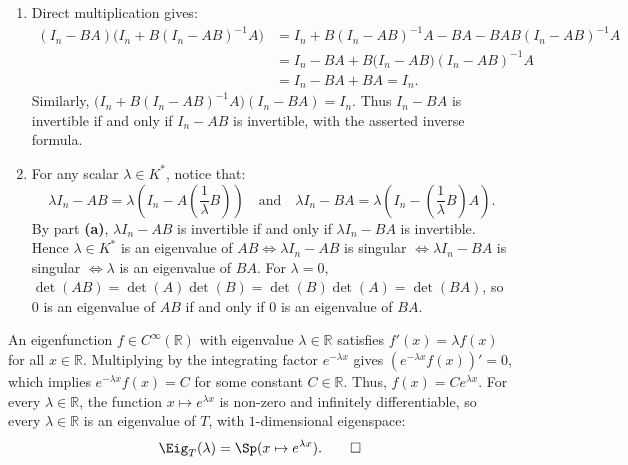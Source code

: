 \begin{exercisesolution}
\label{sol:resolvent_identity_matrix_products}
\begin{enumerate}[label=\textbf{(\alph*)}]
    \item Direct multiplication gives:
    \begin{align*}
    (I_n - BA)\big(I_n + B(I_n - AB)^{-1}A\big) &= I_n + B(I_n - AB)^{-1}A - BA - BAB(I_n - AB)^{-1}A \\
    &= I_n - BA + B\big(I_n - AB\big)(I_n - AB)^{-1}A \\
    &= I_n - BA + BA = I_n.
    \end{align*}
    Similarly, $\big(I_n + B(I_n - AB)^{-1}A\big)(I_n - BA) = I_n$.
    Thus $I_n - BA$ is invertible if and only if $I_n - AB$ is invertible, with the asserted inverse formula.

    \item For any scalar $\lambda \in K^*$, notice that:
    \[
    \lambda I_n - AB = \lambda\left(I_n - A\left(\frac{1}{\lambda}B\right)\right) \quad \text{and} \quad \lambda I_n - BA = \lambda\left(I_n - \left(\frac{1}{\lambda}B\right)A\right).
    \]
    By part \textbf{(a)}, $\lambda I_n - AB$ is invertible if and only if $\lambda I_n - BA$ is invertible.
    Hence $\lambda \in K^*$ is an eigenvalue of $AB \iff \lambda I_n - AB$ is singular $\iff \lambda I_n - BA$ is singular $\iff \lambda$ is an eigenvalue of $BA$.
    For $\lambda = 0$, $\det(AB) = \det(A)\det(B) = \det(B)\det(A) = \det(BA)$, so $0$ is an eigenvalue of $AB$ if and only if $0$ is an eigenvalue of $BA$. \qedhere
\end{enumerate}
\end{exercisesolution}

\begin{exercisesolution*}
\label{sol:eigenfunctions_derivative_operator}
An eigenfunction $f \in C^\infty(\mathbb{R})$ with eigenvalue $\lambda \in \mathbb{R}$ satisfies $f'(x) = \lambda f(x)$ for all $x \in \mathbb{R}$.
Multiplying by the integrating factor $e^{-\lambda x}$ gives $(e^{-\lambda x} f(x))' = 0$, which implies $e^{-\lambda x} f(x) = C$ for some constant $C \in \mathbb{R}$.
Thus, $f(x) = C e^{\lambda x}$.
For every $\lambda \in \mathbb{R}$, the function $x \mapsto e^{\lambda x}$ is non-zero and infinitely differentiable, so every $\lambda \in \mathbb{R}$ is an eigenvalue of $T$, with $1$-dimensional eigenspace:
\[
\Eig_T(\lambda) = \Sp(x \mapsto e^{\lambda x}). \qedhere
\]
\end{exercisesolution*}


